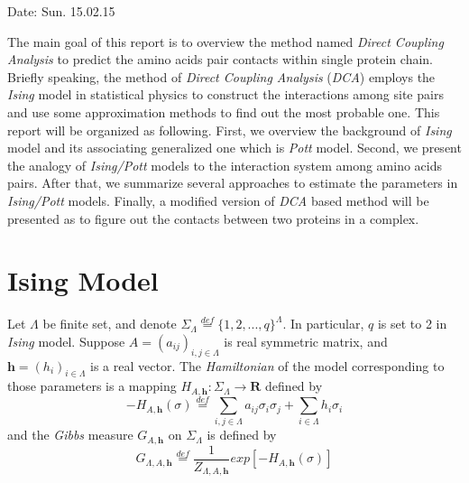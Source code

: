 \documentclass[a4paper,12pt]{article}
\begin{document}
Date: Sun. 15.02.15

The main goal of this report is to overview the method named \emph {Direct Coupling Analysis} to predict the amino acids pair contacts within single protein chain. Briefly speaking, the method of \emph {Direct Coupling Analysis} (\emph{DCA}) employs the \emph {Ising} model in statistical physics to construct the interactions among site pairs and use some approximation methods to find out the most probable one. This report will be organized as following. First, we overview the background of \emph {Ising} model and its associating generalized one which is \emph {Pott} model. Second, we present the analogy of \emph {Ising/Pott} models to the interaction system among amino acids pairs. After that, we summarize several approaches to estimate the parameters in \emph {Ising/Pott} models. Finally, a modified version of \emph {DCA} based method will be presented as to figure out the contacts between two proteins in a complex. 

\section{Ising Model}
Let $ \Lambda $ be finite set, and denote $ \Sigma_\Lambda \stackrel{def}{=}\{ 1,2,...,q\}^\Lambda$. In particular, $ q $ is set to 2 in \emph {Ising} model. Suppose $ A = (a_{ij})_{i,j \in \Lambda} $ is real symmetric matrix, and $ \textbf{h} = (h_i)_{i \in \Lambda}$ is a real vector. The \emph {Hamiltonian} of the model corresponding to those parameters is a mapping $ H_{A,\textbf{h}} \colon \Sigma_\Lambda \to \textbf{R} $ defined by
\[ -H_{A,\textbf{h}}(\sigma) \stackrel{def}{=}  \sum_{i,j \in \Lambda} a_{ij}\sigma_i \sigma_j + \sum_{i \in \Lambda} h_i \sigma_i \]
and the \emph{Gibbs} measure $ G_{A,\textbf{h}} $ on $\Sigma_\Lambda$ is defined by 
\[ G_{\Lambda,A,\textbf{h}} \stackrel{def}{=} \frac{1}{Z_{\Lambda,A,\textbf{h}}} exp \left[ -H_{A,\textbf{h}}(\sigma) \right] \]
\end{document}
